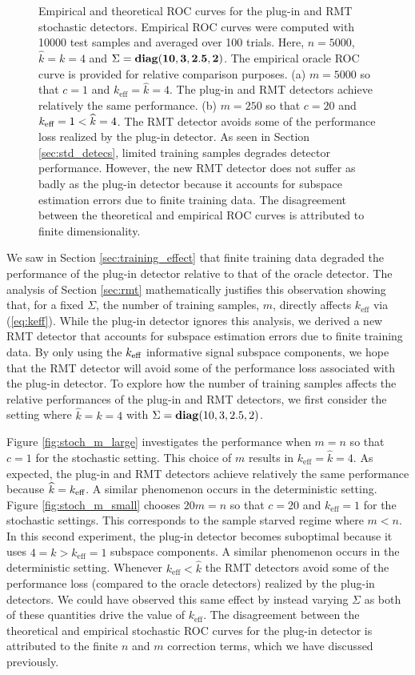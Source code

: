 \begin{figure}
\caption{Empirical and theoretical ROC curves for the plug-in and RMT stochastic detectors. Empirical ROC curves were computed with 10000 test samples and averaged over 100 trials. Here, $n=5000$, $\widehat{k}=k=4$ and $\Sigma = \mathop{\bf diag}({\bf{10,3,2.5,2}})$. The empirical oracle ROC curve is provided for relative comparison purposes. (a) $m=5000$ so that $c=1$ and $k_\text{eff}=\widehat{k}=4$. The plug-in and RMT detectors achieve relatively the same performance. (b) $m=250$ so that $c=20$ and $k_\text{eff}=1<\widehat{k}=4$. The RMT detector avoids some of the performance loss realized by the plug-in detector. As seen in Section \ref{sec:std_detecs}, limited training samples degrades detector performance. However, the new RMT detector does not suffer as badly as the plug-in detector because it accounts for subspace estimation errors due to finite training data. The disagreement between the theoretical and empirical ROC curves is attributed to finite dimensionality.}
\label{fig:stoch_m_effect}
\vspace{-0.3in}
\end{figure}

We saw in Section \ref{sec:training_effect} that finite training data degraded the performance of the plug-in detector relative to that of the oracle detector. The analysis of Section \ref{sec:rmt} mathematically justifies this observation showing that, for a fixed $\Sigma$, the number of training samples, $m$, directly affects $k_\text{eff}$ via (\ref{eq:keff}). While the plug-in detector ignores this analysis, we derived a new RMT detector that accounts for subspace estimation errors due to finite training data. By only using the $k_\text{eff}$ informative signal subspace components, we hope that the RMT detector will avoid some of the performance loss associated with the plug-in detector. To explore how the number of training samples affects the relative performances of the plug-in and RMT detectors, we first consider the setting where $\widehat{k}=k=4$ with $\Sigma=\mathop{\bf diag}(10,3,2.5,2)$. 

Figure \ref{fig:stoch_m_large} investigates the performance when $m=n$ so that $c=1$ for
the stochastic setting.  This
choice of $m$ results in $k_\text{eff}=\widehat{k}=4$. As expected, the plug-in and RMT
detectors achieve relatively the same performance because $\widehat{k}=k_\text{eff}$. A similar
phenomenon occurs in the deterministic setting. Figure
\ref{fig:stoch_m_small} chooses $20m=n$ so that $c=20$ and $k_\text{eff}=1$ for the
stochastic settings. This corresponds to the sample starved regime where $m<n$. In this
second experiment, the plug-in detector becomes suboptimal because it uses $4=\widehat{k}
> k_\text{eff}=1$ subspace components. A similar phenomenon occurs in the deterministic
setting. Whenever $k_\text{eff}<\widehat{k}$ the RMT detectors avoid some of the performance loss (compared to the oracle detectors) realized by the plug-in detectors. We could have observed this same effect by instead varying $\Sigma$ as both of these quantities drive the value of $k_\text{eff}$. The disagreement between the theoretical and empirical stochastic ROC curves for the plug-in detector is attributed to the finite $n$ and $m$ correction terms, which we have discussed previously.

